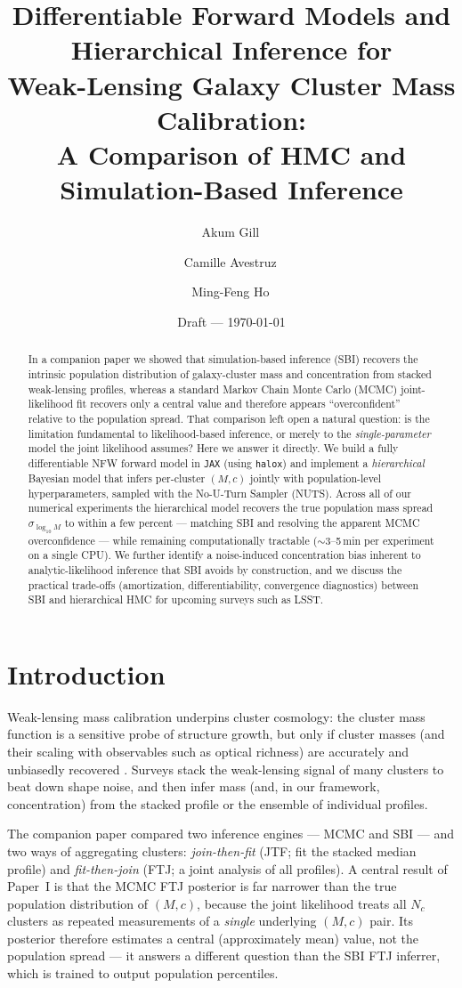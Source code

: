 \documentclass[11pt]{article}
\title{Differentiable Forward Models and Hierarchical Inference for\\
Weak-Lensing Galaxy Cluster Mass Calibration:\\
A Comparison of HMC and Simulation-Based Inference}
\author[1,2]{Akum Gill\,\orcidlink{0000-0002-4383-4860}}
\author[3,4]{Camille Avestruz\,\orcidlink{0000-0001-8868-0810}}
\author[3,4]{Ming-Feng Ho\,\orcidlink{0000-0002-4457-890X}}
\affil[1]{\small Department of Physics, Harvard University}
\affil[2]{\small Center for Astrophysics \textbar\ Harvard \& Smithsonian}
\affil[3]{\small Department of Physics, University of Michigan}
\affil[4]{\small Leinweber Institute for Theoretical Physics, University of Michigan}
\date{Draft --- \today}
\newcommand{\code}[1]{\texttt{#1}}
\begin{document}
\maketitle

\begin{abstract}
In a companion paper we showed that simulation-based inference (SBI) recovers the intrinsic
population distribution of galaxy-cluster mass and concentration from stacked weak-lensing
profiles, whereas a standard Markov Chain Monte Carlo (MCMC) joint-likelihood fit recovers only a
central value and therefore appears ``overconfident'' relative to the population spread. That
comparison left open a natural question: is the limitation fundamental to likelihood-based
inference, or merely to the \emph{single-parameter} model the joint likelihood assumes? Here we
answer it directly. We build a fully differentiable NFW forward model in \code{JAX} (using
\code{halox}) and implement a \emph{hierarchical} Bayesian model that infers per-cluster
$(M,c)$ jointly with population-level hyperparameters, sampled with the No-U-Turn Sampler (NUTS).
Across all of our numerical experiments the hierarchical model recovers the true population
mass spread $\sigma_{\log_{10}M}$ to within a few percent --- matching SBI and resolving the
apparent MCMC overconfidence --- while remaining computationally tractable
($\sim$3--5\,min per experiment on a single CPU). We further identify a noise-induced
concentration bias inherent to analytic-likelihood inference that SBI avoids by construction, and
we discuss the practical trade-offs (amortization, differentiability, convergence diagnostics)
between SBI and hierarchical HMC for upcoming surveys such as LSST.
\end{abstract}

\section{Introduction}
\label{sec:intro}

Weak-lensing mass calibration underpins cluster cosmology: the cluster mass function is a sensitive
probe of structure growth, but only if cluster masses (and their scaling with observables such as
optical richness) are accurately and unbiasedly recovered \citep{Pratt2019}. Surveys stack the
weak-lensing signal of many clusters to beat down shape noise, and then infer mass (and, in our
framework, concentration) from the stacked profile or the ensemble of individual profiles.

The companion paper \citep[][hereafter Paper~I]{paper1} compared two inference engines --- MCMC and
SBI --- and two ways of aggregating clusters: \emph{join-then-fit} (JTF; fit the stacked median
profile) and \emph{fit-then-join} (FTJ; a joint analysis of all profiles). A central result of
Paper~I is that the MCMC FTJ posterior is far narrower than the true population distribution of
$(M,c)$, because the joint likelihood treats all $N_c$ clusters as repeated measurements of a
\emph{single} underlying $(M,c)$ pair. Its posterior therefore estimates a central
(approximately mean) value, not the population spread --- it answers a different question than the
SBI FTJ inferrer, which is trained to output population percentiles.
\end{document}
